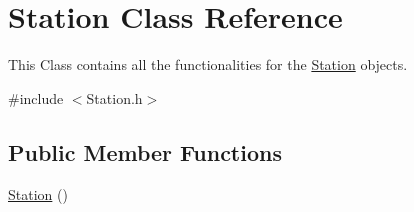 \hypertarget{classStation}{}\section{Station Class Reference}
\label{classStation}


This Class contains all the functionalities for the \hyperlink{classStation}{Station} objects.  




{\ttfamily \#include $<$Station.\+h$>$}

\subsection*{Public Member Functions}
\begin{DoxyCompactItemize}
\item 
\hyperlink{classStation_a73d335726aad1d844d81cda6d9fd74e6}{Station} ()\hypertarget{classStation_a73d335726aad1d844d81cda6d9fd74e6}{}\label{classStation_a73d335726aad1d844d81cda6d9fd74e6}


\end{DoxyCompactItemize}
